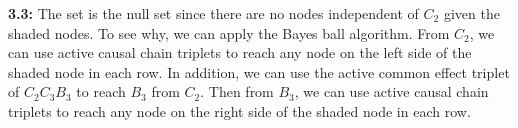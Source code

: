 \documentclass[12pt]{article}
\begin{document}
\textbf{3.3:} The set is the null set since there are no nodes independent of $C_2$ given the shaded nodes. To see why, we can apply the Bayes ball algorithm. From $C_2$, we can use active causal chain triplets to reach any node on the left side of the shaded node in each row. In addition, we can use the active common effect triplet of $C_2C_3B_3$ to reach $B_3$ from $C_2$. Then from $B_3$, we can use active causal chain triplets to reach any node on the right side of the shaded node in each row.
\end{document}
